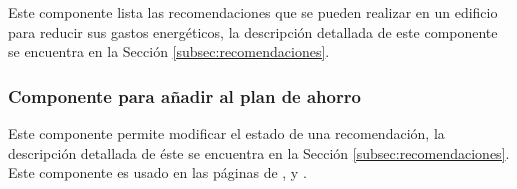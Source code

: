 Este componente lista las recomendaciones que se pueden realizar en un edificio para
reducir sus gastos energéticos, la descripción detallada de este componente se
encuentra en la Sección \ref{subsec:recomendaciones}.

\subsubsection{Componente para añadir al plan de ahorro}

Este componente permite modificar el estado de una recomendación,
la descripción detallada de éste se encuentra en la Sección
\ref{subsec:recomendaciones}. Este componente es usado en las páginas de
,  y
.
